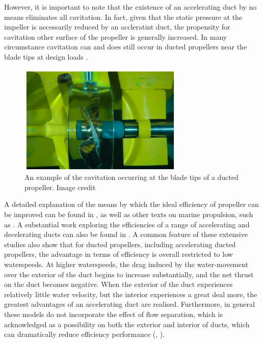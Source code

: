 \documentclass{article}\usepackage[]{graphicx}\usepackage[]{color}
\begin{document}
However, it is important to note that the existence of an accelerating duct by no means eliminates all cavitation.  In fact, given that the static pressure at the impeller is necessarily reduced by an accleratint duct, the propensity for cavitation other surface of the propeller is generally increased.  In many circumstance cavitation can and does still occur in ducted propellers near the blade tips at design loads \parencite{moulijn2015}.

\begin{figure}[h]
\captionsetup{width=0.7\textwidth}
\includegraphics[width=0.7\textwidth, center]{CavitatingDuct.png}
\caption{An example of the cavitation occurring at the blade tips of a ducted propeller. Image credit \cite{moulijn2015}}
\label{fig:CavitatingDuct.png}
\end{figure}

A detailed explanation of the means by which the ideal efficiency of propeller can be improved can be found in \cite[213-222]{lewis1988}, as well as other texts on marine propulsion, such as \cite{carlton2007}. A substantial work exploring the efficiencies of a range of accelerating and decelerating ducts can also be found in \cite{oosterveld1970}.  A common feature of these extensive studies also show that for ducted propellers, including accelerating ducted propellers, the advantage in terms of efficiency is overall restricted to low waterspeeds.  At higher waterspeeds, the drag induced by the water-movement over the exterior of the duct begins to increase substantially, and the net thrust on the duct becomes negative.  When the exterior of the duct experiences relatively little water velocity, but the interior experiences a great deal more, the greatest advantages of an accelerating duct are realised.  Furthermore, in general these models do not incorporate the effect of flow separation, which is acknowledged as a possibility on both the exterior and interior of ducts, which can dramatically reduce efficiency performance (\cite[20]{oosterveld1970}, \cite[214]{lewis1988}).
\end{document}
